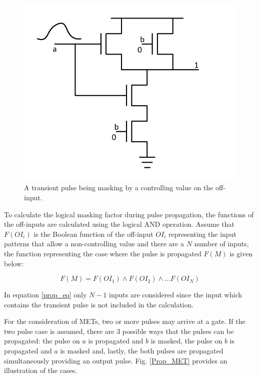 \begin{figure}[!htbp]
	\centering
	\includegraphics[width=0.55\linewidth]{Figures/Prop_func}
	\caption{A transient pulse being masking by a controlling value on the off-input.}
	\label{Prop_NAND}
\end{figure}

To calculate the logical masking factor during pulse propagation, the functions of the off-inputs are calculated using the logical AND operation. Assume that $F(OI_i)$ is the Boolean function of the off-input $OI_i$ representing the input patterns that allow a non-controlling value and there are a $N$ number of inputs, the function representing the case where the pulse is propagated $F(M)$ is given below:

\begin{equation} \label{prop_eq}
F(M) = F(OI_1) \land F(OI_2) \land ... F(OI_N)
\end{equation}

In equation \ref{prop_eq} only $N-1$ inputs are considered since the input which contains the transient pulse is not included in the calculation. 

For the consideration of METs, two or more pulses may arrive at a gate. If the two pulse case is assumed, there are 3 possible ways that the pulses can be propagated: the pulse on $a$ is propagated and $b$ is masked, the pulse on $b$ is propagated and $a$ is masked and, lastly, the both pulses are propagated simultaneously providing an output pulse. Fig. \ref{Prop_MET} provides an illustration of the cases.

